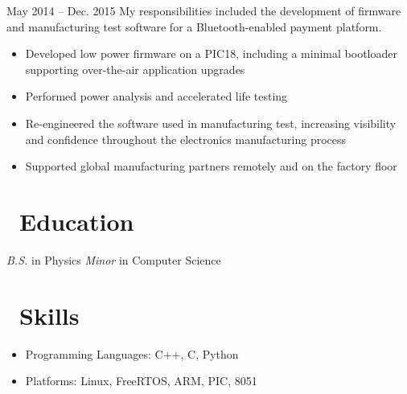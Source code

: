\documentclass{resume}
\begin{document}
          {May 2014 -- Dec. 2015}
My responsibilities included the development of firmware and manufacturing
test software for a Bluetooth-enabled payment platform.
\begin{itemize}
  \item Developed low power firmware on a PIC18, including
      a minimal bootloader supporting over-the-air application upgrades
  \item Performed power analysis and accelerated life testing
  \item Re-engineered the software used in manufacturing test, increasing visibility
        and confidence throughout the electronics manufacturing process
  \item Supported global manufacturing partners remotely and on the factory floor
\end{itemize}
\vspace{3mm}

\section{\faGraduationCap\ Education}
\textit{B.S.} in Physics
\newline
\textit{Minor} in Computer Science

\section{\faCogs\ Skills}
\begin{itemize}[parsep=0.5ex]
  \item Programming Languages: C++, C, Python
  \item Platforms: Linux, FreeRTOS, ARM, PIC, 8051
\end{itemize}
\end{document}
